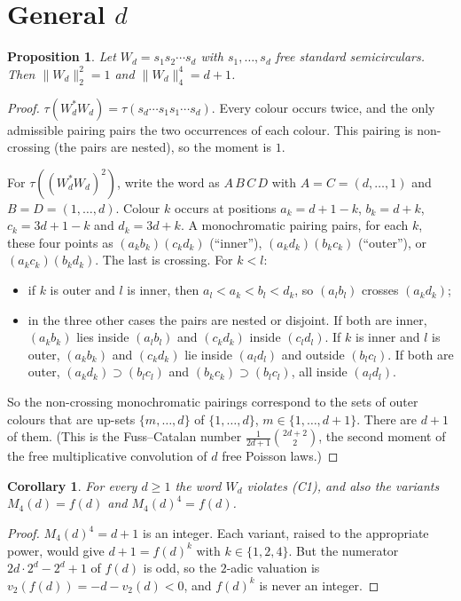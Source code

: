 \documentclass[11pt]{article}
\newtheorem{proposition}[theorem]{Proposition}
\newtheorem{corollary}[theorem]{Corollary}
\theoremstyle{definition}
\theoremstyle{remark}
\begin{document}
\section{General \texorpdfstring{$d$}{d}}

\begin{proposition}\label{prop:fuss}
Let $W_d=s_1s_2\cdots s_d$ with $s_1,\dots,s_d$ free standard semicirculars. Then
$\|W_d\|_2^2=1$ and $\|W_d\|_4^4=d+1$.
\end{proposition}

\begin{proof}
$\tau(W_d^*W_d)=\tau(s_d\cdots s_1s_1\cdots s_d)$. Every colour occurs twice, and the only
admissible pairing pairs the two occurrences of each colour. This pairing is non-crossing (the
pairs are nested), so the moment is $1$.

For $\tau((W_d^*W_d)^2)$, write the word as $A\,B\,C\,D$ with $A=C=(d,\dots,1)$ and
$B=D=(1,\dots,d)$. Colour $k$ occurs at positions $a_k=d+1-k$, $b_k=d+k$, $c_k=3d+1-k$ and
$d_k=3d+k$. A monochromatic pairing pairs, for each $k$, these four points as
$(a_kb_k)(c_kd_k)$ (``inner''), $(a_kd_k)(b_kc_k)$ (``outer''), or $(a_kc_k)(b_kd_k)$. The last
is crossing. For $k<l$:
\begin{itemize}
\item if $k$ is outer and $l$ is inner, then $a_l<a_k<b_l<d_k$, so $(a_lb_l)$ crosses $(a_kd_k)$;
\item in the three other cases the pairs are nested or disjoint. If both are inner, $(a_kb_k)$ lies
inside $(a_lb_l)$ and $(c_kd_k)$ inside $(c_ld_l)$. If $k$ is inner and $l$ is outer,
$(a_kb_k)$ and $(c_kd_k)$ lie inside $(a_ld_l)$ and outside $(b_lc_l)$. If both are outer,
$(a_kd_k)\supset(b_lc_l)$ and $(b_kc_k)\supset(b_lc_l)$, all inside $(a_ld_l)$.
\end{itemize}
So the non-crossing monochromatic pairings correspond to the sets of outer colours that are
up-sets $\{m,\dots,d\}$ of $\{1,\dots,d\}$, $m\in\{1,\dots,d+1\}$. There are $d+1$ of them.
(This is the Fuss--Catalan number $\frac1{2d+1}\binom{2d+2}{2}$, the second moment of the free
multiplicative convolution of $d$ free Poisson laws.)
\end{proof}

\begin{corollary}\label{cor:alld}
For every $d\ge1$ the word $W_d$ violates (C1), and also the variants $M_4(d)=f(d)$ and
$M_4(d)^4=f(d)$.
\end{corollary}

\begin{proof}
$M_4(d)^4=d+1$ is an integer. Each variant, raised to the appropriate power, would give
$d+1=f(d)^k$ with $k\in\{1,2,4\}$. But the numerator $2d\cdot2^d-2^d+1$ of $f(d)$ is odd, so the
$2$-adic valuation is $v_2(f(d))=-d-v_2(d)<0$, and $f(d)^k$ is never an integer.
\end{proof}
\end{document}
